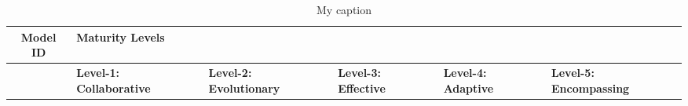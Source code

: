 \documentclass[a4paper,oneside]{bth}
\begin{document}
\begin{longtable}[h] {|c|p{2cm}|p{2cm}|p{2cm}|p{2cm}|p{2.2cm}|}
\caption{My caption}
\label{my-label}\\
\hline
\textbf{Model ID} & \multicolumn{5}{l|}{\textbf{Maturity Levels}}                                                                                                                                                                                                                                                                                                                                                                                                                                                                                                                                                                                                                                                                                                                                                                                                                                                                                                                                                                                                                                                                                                                                                                                                      \\ \hline
                  & \textbf{Level-1: Collaborative}                                                                                                                                                                                       & \textbf{Level-2: Evolutionary}                                                                                                                                                                                                                   & \textbf{Level-3: Effective}                                                                                                                                                                                                                                          & \textbf{Level-4: Adaptive}                                                                                                                                                                                                                                            & \textbf{Level-5: Encompassing}                                                                                                                                                                                           \\ \hline

\end{longtable}
\end{document}
